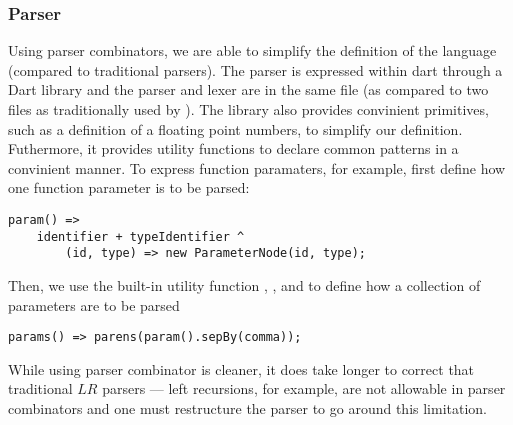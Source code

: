 \subsubsection{Parser}

Using parser combinators, we are able to simplify the definition of 
	the language (compared to traditional  parsers).
The parser is expressed within dart through a Dart library and
	the parser and lexer are in the same file (as compared to two
	files as traditionally used by ).
The library also provides convinient primitives, such as a definition of
	a floating point numbers, to simplify our definition.
Futhermore, it provides utility functions to declare common patterns
	in a convinient manner.
To express function paramaters, for example, first define how one function
	parameter is to be parsed:

\begin{verbatim}
param() =>
	identifier + typeIdentifier ^
		(id, type) => new ParameterNode(id, type); 
\end{verbatim}

Then, we use the built-in utility function , ,
	and  to define how a collection of parameters are
	to be parsed

\begin{verbatim}
params() => parens(param().sepBy(comma));
\end{verbatim}

While using parser combinator is cleaner, it does take longer to correct
	that traditional $LR$ parsers --- left recursions, for example, are
	not allowable in parser combinators and one must restructure the parser
	to go around this limitation.
